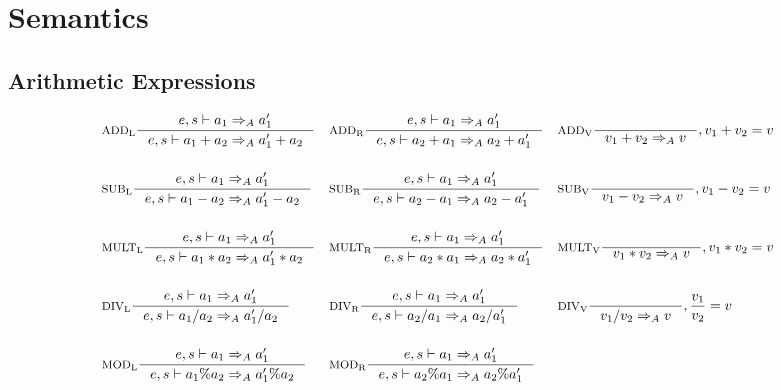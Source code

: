 \section{Semantics}
\subsection{Arithmetic Expressions}
\begin{align*}
&\inference[$\text{ADD}_\text{L}$]{e,s \vdash a_1 \Rightarrow_A a_1'}
                    {e,s \vdash  a_1 + a_2 \Rightarrow_A a_1' + a_2}
&
&\inference[$\text{ADD}_\text{R}$]{e,s \vdash a_1 \Rightarrow_A a_1'}
										{e,s \vdash a_2 + a_1 \Rightarrow_A a_2 + a_1'}
&
&\inference[$\text{ADD}_\text{V}$]{}
                    {v_1 + v_2 \Rightarrow_A v}
										{, v_1 + v_2 = v}
\\\\
&\inference[$\text{SUB}_\text{L}$]{e,s \vdash a_1 \Rightarrow_A a_1'}
                    {e,s \vdash a_1 - a_2 \Rightarrow_A a_1' - a_2}
&
&\inference[$\text{SUB}_\text{R}$]{e,s \vdash a_1 \Rightarrow_A a_1'}
                    {e,s \vdash a_2 - a_1 \Rightarrow_A a_2 - a_1'}
&
&\inference[$\text{SUB}_\text{V}$]{}
                    {v_1 - v_2 \Rightarrow_A v}
										{, v_1 - v_2 = v}
\\\\
&\inference[$\text{MULT}_\text{L}$]{e,s \vdash a_1 \Rightarrow_A a_1'}
                     {e,s \vdash a_1 * a_2 \Rightarrow_A a_1' * a_2}
&
&\inference[$\text{MULT}_\text{R}$]{e,s \vdash a_1 \Rightarrow_A a_1'}
                     {e,s \vdash a_2 * a_1 \Rightarrow_A a_2 * a_1'}
&
&\inference[$\text{MULT}_\text{V}$]{}
                     {v_1 * v_2 \Rightarrow_A v}
										 {, v_1 * v_2 = v}
\\\\
&\inference[$\text{DIV}_\text{L}$]{e,s \vdash a_1 \Rightarrow_A a_1'}
                    {e,s \vdash a_1 / a_2 \Rightarrow_A a_1' / a_2}
&
&\inference[$\text{DIV}_\text{R}$]{e,s \vdash a_1 \Rightarrow_A a_1'}
                    {e,s \vdash a_2 / a_1 \Rightarrow_A a_2 / a_1'}
&
&\inference[$\text{DIV}_\text{V}$]{}
                    {v_1 / v_2 \Rightarrow_A v}
										{, \frac{v_1}{v_2} = v}
\\\\
&\inference[$\text{MOD}_\text{L}$]{e,s \vdash a_1 \Rightarrow_A a_1'}
                    {e,s \vdash a_1 \% a_2 \Rightarrow_A a_1' \% a_2}
&
&\inference[$\text{MOD}_\text{R}$]{e,s \vdash a_1 \Rightarrow_A a_1'}
                    {e,s \vdash a_2 \% a_1 \Rightarrow_A a_2 \% a_1'}

\end{align*}
